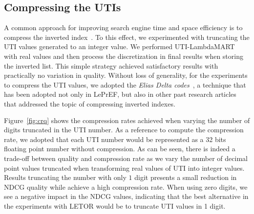 \documentclass[preprint,review,10pt,3p]{elsarticle}
\begin{document}
\subsection{Compressing the UTIs}
\label{sec:compression} 

A common approach for improving search engine time and space efficiency is to compress the inverted index~\cite{baezaribeiro2011modinforet}. To this effect, we experimented with truncating the UTI values generated to an integer value. We performed UTI-LambdaMART with real values and then process the discretization in final results when storing  the inverted list. This simple strategy achieved satisfactory results with practically no variation in quality. Without loss of generality, for the experiments to compress the UTI values, we adopted the \textit{Elias Delta codes}~\cite{elias1975universal}, a technique that has been adopted not only in LePrEF, but also in other past research articles that addressed the topic of compressing inverted indexes.

 Figure~\ref{fig:crq} shows the compression rates achieved when varying the number of digits truncated in the UTI number. As a reference to compute the compression rate, we adopted that each UTI number would be represented as a 32 bits floating point number without compression. As can be seen,  there is indeed a trade-off between quality and compression rate as we vary the number of decimal point values truncated when transforming real values of UTI into integer values. Results truncating the number with only $1$ digit presents a small reduction in NDCG quality while achieve a high compression rate. When using zero digits, we see a negative impact in the NDCG values, indicating that the best alternative in the experiments with LETOR would be to truncate UTI values in 1 digit.


\end{document}
